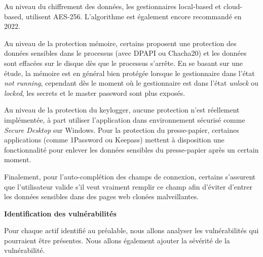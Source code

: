 Au niveau du chiffrement des données, les gestionnaires local-based et cloud-based, utilisent AES-256. L'algorithme est également encore recommandé en 2022.

Au niveau de la protection mémoire, certains proposent une protection des données sensibles dans le processus (avec DPAPI ou Chacha20) et les données sont effacées sur le disque dès que le processus s'arrête. En se basant sur une étude\cite{iseexploit}, la mémoire est en général bien protégée lorsque le gestionnaire dans l'état \textit{not running}, cependant dès le moment où le gestionnaire est dans l'état \textit{unlock} ou \textit{locked}, les secrets et le master password sont plus exposés. 

Au niveau de la protection du keylogger, aucune protection n'est réellement implémentée, à part utiliser l'application dans environnement sécurisé comme \textit{Secure Desktop} sur Windows. Pour la protection du presse-papier, certaines applications (comme 1Password ou Keepass) mettent à disposition une fonctionnalité pour enlever les données sensibles du presse-papier après un certain moment.

Finalement, pour l'auto-complétion des champs de connexion, certains s'assurent que l'utilisateur valide s'il veut vraiment remplir ce champ afin d'éviter d'entrer les données sensibles dans des pages web clonées malveillantes.

\textbf{Identification des vulnérabilités}

Pour chaque actif identifié au préalable, nous allons analyser les vulnérabilités qui pourraient être présentes. Nous allons également ajouter la sévérité de la vulnérabilité. 

